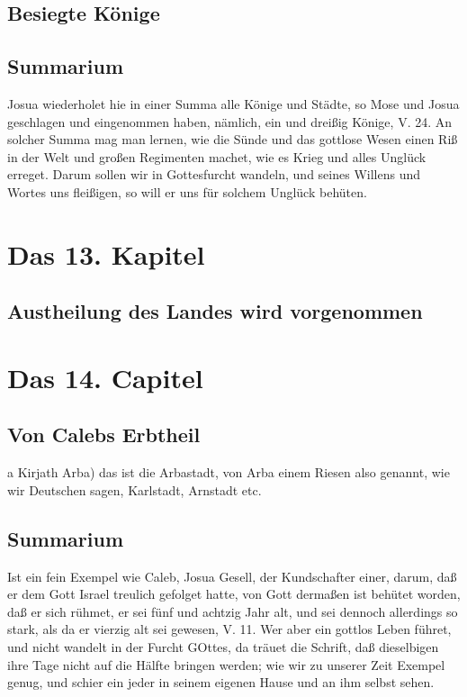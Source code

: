 \section{Besiegte Könige}

\section{Summarium}

Josua wiederholet hie in einer Summa alle Könige und Städte, so Mose und Josua geschlagen und eingenommen haben, nämlich, ein und dreißig Könige, V. 24. An solcher Summa mag man lernen, wie die Sünde und das gottlose Wesen einen Riß in der Welt und großen Regimenten machet, wie es Krieg und alles Unglück erreget. Darum sollen wir in Gottesfurcht wandeln, und seines Willens und Wortes uns fleißigen, so will er uns für solchem Unglück behüten.

\chapter{Das 13. Kapitel}

\section{Austheilung des Landes wird vorgenommen}
\chapter{Das 14. Capitel}

\section{Von Calebs Erbtheil}

a Kirjath Arba) das ist die Arbastadt, von Arba einem Riesen also genannt, wie wir Deutschen sagen, Karlstadt, Arnstadt etc.

\section{Summarium}

Ist ein fein Exempel wie Caleb, Josua Gesell, der Kundschafter einer, darum, daß er dem Gott Israel treulich gefolget hatte, von Gott dermaßen ist behütet worden, daß er sich rühmet, er sei fünf und achtzig Jahr alt, und sei dennoch allerdings so stark, als da er vierzig alt sei gewesen, V. 11. Wer aber ein gottlos Leben führet, und nicht wandelt in der Furcht GOttes, da träuet die Schrift, daß dieselbigen ihre Tage nicht auf die Hälfte bringen werden; wie wir zu unserer Zeit Exempel genug, und schier ein jeder in seinem eigenen Hause und an ihm selbst sehen.

